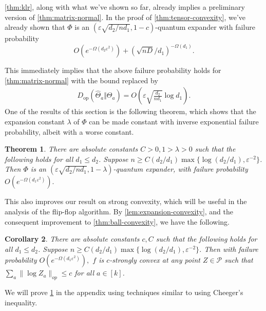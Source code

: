 \documentclass[aos]{imsart}
\newtheorem{theorem}{Theorem}[section]
\newtheorem{corollary}[theorem]{Corollary}
\theoremstyle{definition}
\numberwithin{equation}{section}
\DeclareMathOperator{\op}{op}
\newcommand{\eps}{\varepsilon}
\newcommand{\SPD}{\mathcal{P}}
\begin{document}
\cref{thm:klr}, along with what we've shown so far, already implies a preliminary version of \cref{thm:matrix-normal}. In the proof of \cref{thm:tensor-convexity}, we've already shown that $\Phi$ is an $(\eps \sqrt{d_2/n d_1}, 1 - c)$-quantum expander with failure probability 
$$O(e^{ - \Omega( d_2 \eps^2)}) + (\sqrt{nD}/{d_1})^{ - \Omega(d_1)}.$$ 

This immediately implies that the above failure probability holds for \cref{thm:matrix-normal} with the bound replaced by
\begin{align*}
  D_{\op}(\widehat{\Theta}_a \Vert \Theta_a) = O\left(\eps \sqrt{\frac{d_{2}}{n d_1}} \log d_1\right).
\end{align*}
One of the results of this section is the following theorem, which shows that the expansion constant $\lambda$ of $\Phi$ can be made constant with inverse exponential failure probability, albeit with a worse constant. 

\begin{theorem}\label{thm:operator-cheeger}
There are absolute constants $ C > 0, 1 > \lambda > 0$ such that the following holds for all $d_1 \leq d_2$. Suppose $n \geq C (d_2/d_1) \max\{\log (d_2/d_1),  \eps^{-2}\} $. Then $\Phi$ is an $(\eps \sqrt{d_2/n d_1}, 1 - \lambda)$-quantum expander, with failure probability $O(e^{ - \Omega( d_1 \eps^2)}).$ 
\end{theorem}
This also improves our result on strong convexity, which will be useful in the analysis of the flip-flop algorithm. By \cref{lem:expansion-convexity}, and the consequent improvement to \cref{thm:ball-convexity}, we have the following.
\begin{corollary}\label{cor:matrix-convexity} There are absolute constants $c, C$ such that the following holds for all $d_1 \leq d_2$. Suppose $n \geq C (d_2/d_1) \max\{\log (d_2/d_1),  \eps^{-2}\} $. Then with failure probability $O(e^{ - \Omega( d_1 \eps^2)}),$ $f$ is $c$-strongly convex at any point $Z \in \SPD$ such that $\sum_a \|\log Z_a\|_{op} \leq c$ for all $a \in [k]$.
\end{corollary}

We will prove \cref{thm:operator-cheeger} in the appendix using techniques similar to \cite{FM20} using Cheeger's inequality. 
\end{document}
